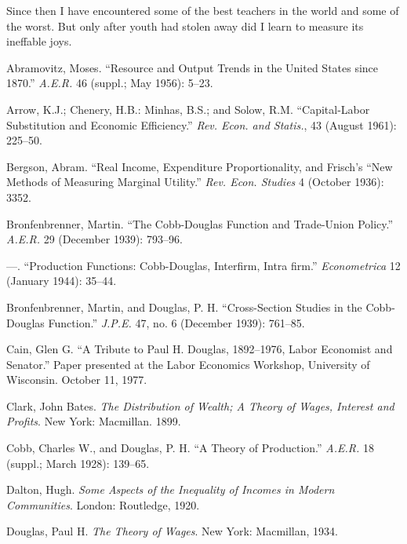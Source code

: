 \documentclass{article}
\begin{document}
Since then I have encountered some of the best teachers in the world and some of the worst. But only after youth had stolen away did I learn to measure its ineffable joys.

\begin{thebibliography}{00}

Abramovitz, Moses. \foreignlanguage{english}{``Resource and Output Trends in the United States since 1870.'' \emph{A.E.R.} 46 (suppl.; May 1956): 5--23.}

Arrow, K.J.; Chenery, H.B.: Minhas, B.S.; and Solow, R.M. \foreignlanguage{english}{``Capital-Labor Substitution and Economic Efficiency.'' \emph{Rev. Econ. and Statis.}, 43 (August 1961): 225--50.}

Bergson, Abram. \foreignlanguage{english}{``Real Income, Expenditure Proportionality, and Frisch's ``New Methods of Measuring Marginal Utility.'' \emph{Rev. Econ. Studies} 4 (October 1936): 3352.}

Bronfenbrenner, Martin. \foreignlanguage{english}{``The Cobb-Douglas Function and Trade-Union Policy.'' \emph{A.E.R.} 29 (December 1939): 793--96.}

---. \foreignlanguage{english}{``Production Functions: Cobb-Douglas, Interfirm, Intra firm.'' \emph{Econometrica} 12 (January 1944): 35--44.}

Bronfenbrenner, Martin, and Douglas, P. \foreignlanguage{english}{H. ``Cross-Section Studies in the Cobb-Douglas Function.'' \emph{J.P.E.} 47, no. 6 (December 1939): 761--85.}

Cain, Glen G. \foreignlanguage{english}{``A Tribute to Paul H. Douglas, 1892--1976, Labor Economist and Senator.'' Paper presented at the Labor Economics Workshop, University of Wisconsin. October 11, 1977.}

Clark, John Bates. \foreignlanguage{english}{\emph{The Distribution of Wealth; A Theory of Wages, Interest and Profits}. New York: Macmillan. 1899.}

Cobb, Charles W., and Douglas, P. \foreignlanguage{english}{H. ``A Theory of Production.'' \emph{A.E.R.} 18 (suppl.; March 1928): 139--65.}

Dalton, Hugh. \foreignlanguage{english}{\emph{Some Aspects of the Inequality of Incomes in Modern Communities}. London: Routledge, 1920.}

Douglas, Paul H. \foreignlanguage{english}{\emph{The Theory of Wages}. New York: Macmillan, 1934.}


\end{thebibliography}
\end{document}
